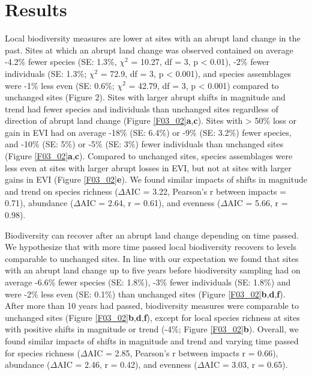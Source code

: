 \section{Results}
\label{C03_03}
Local biodiversity measures are lower at sites with an abrupt land change in the past. Sites at which an abrupt land change was observed contained on average -4.2\% fewer species (SE: 1.3\%, $\chi^2$ = 10.27, df = 3, p < 0.01), -2\% fewer individuals (SE: 1.3\%; $\chi^2$ = 72.9, df = 3, p < 0.001), and species assemblages were -1\% less even (SE: 0.6\%; $\chi^2$ = 42.79, df = 3, p < 0.001) compared to unchanged sites (Figure 2). Sites with larger abrupt shifts in magnitude and trend had fewer species and individuals than unchanged sites regardless of direction of abrupt land change (Figure \ref{F03_02}\textbf{a},\textbf{c}). Sites with > 50\% loss or gain in EVI had on average -18\% (SE: 6.4\%) or -9\% (SE: 3.2\%) fewer species, and -10\% (SE: 5\%) or -5\% (SE: 3\%) fewer individuals than unchanged sites (Figure \ref{F03_02}\textbf{a},\textbf{c}). Compared to unchanged sites, species assemblages were less even at sites with larger abrupt losses in EVI, but not at sites with larger gains in EVI (Figure \ref{F03_02}\textbf{e}). We found similar impacts of shifts in magnitude and trend on species richness ($\Delta$AIC = 3.22, Pearson’s r between impacts = 0.71), abundance ($\Delta$AIC = 2.64, r = 0.61), and evenness ($\Delta$AIC = 5.66, r = 0.98).

Biodiversity can recover after an abrupt land change depending on time passed. We hypothesize that with more time passed local biodiversity recovers to levels comparable to unchanged sites. In line with our expectation we found that sites with an abrupt land change up to five years before biodiversity sampling had on average -6.6\% fewer species (SE: 1.8\%), -3\% fewer individuals (SE: 1.8\%) and were -2\% less even (SE: 0.1\%) than unchanged sites (Figure \ref{F03_02}\textbf{b},\textbf{d},\textbf{f}). After more than 10 years had passed, biodiversity measures were comparable to unchanged sites (Figure \ref{F03_02}\textbf{b},\textbf{d},\textbf{f}), except for local species richness at sites with positive shifts in magnitude or trend (-4\%; Figure \ref{F03_02}\textbf{b}). Overall, we found similar impacts of shifts in magnitude and trend and varying time passed for species richness ($\Delta$AIC = 2.85, Pearson’s r between impacts r = 0.66), abundance ($\Delta$AIC = 2.46, r = 0.42), and evenness ($\Delta$AIC = 3.03, r = 0.65).

